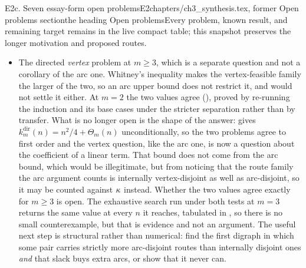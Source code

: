 \begin{offcut}{E2c. Seven essay-form open problems}{E2}{chapters/ch3\_synthesis.tex, former Open problems section}{the heading Open problems}{Every problem, known result, and remaining target remains in the live compact table; this snapshot preserves the longer motivation and proposed routes.}
\begin{itemize}
    \item The directed \emph{vertex} problem at $m \ge 3$, which is a separate question and not a corollary of the arc one. Whitney's inequality makes the vertex-feasible family the larger of the two, so an arc upper bound does not restrict it, and  would not settle it either. At $m = 2$ the two values agree (), proved by re-running the induction and its base cases under the stricter separation rather than by transfer. What is no longer open is the shape of the answer:  gives $k_m^{\mathrm{dir}}(n) = n^2/4 + \Theta_m(n)$ unconditionally, so the two problems agree to first order and the vertex question, like the arc one, is now a question about the coefficient of a linear term. That bound does not come from the arc bound, which would be illegitimate, but from noticing that the route family the arc argument counts is internally vertex-disjoint as well as arc-disjoint, so it may be counted against $\kappa$ instead. Whether the two values agree exactly for $m \ge 3$ is open. The exhaustive search run under both tests at $m = 3$ returns the same value at every $n$ it reaches, tabulated in , so there is no small counterexample, but that is evidence and not an argument. The useful next step is structural rather than numerical: find the first digraph in which some pair carries strictly more arc-disjoint routes than internally disjoint ones \emph{and} that slack buys extra arcs, or show that it never can.

\end{itemize}
\end{offcut}
